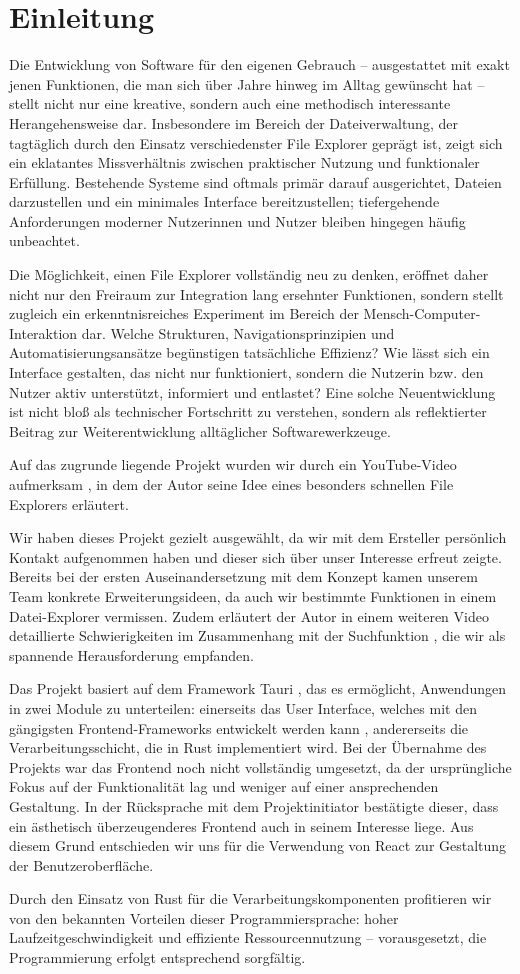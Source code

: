 \section{Einleitung}

Die Entwicklung von Software für den eigenen Gebrauch – ausgestattet mit exakt jenen Funktionen, die man sich über Jahre hinweg im
Alltag gewünscht hat – stellt nicht nur eine kreative, sondern auch eine methodisch interessante Herangehensweise dar.
Insbesondere im Bereich der Dateiverwaltung, der tagtäglich durch den Einsatz verschiedenster File Explorer geprägt ist, zeigt
sich ein eklatantes Missverhältnis zwischen praktischer Nutzung und funktionaler Erfüllung. Bestehende Systeme sind oftmals primär
darauf ausgerichtet, Dateien darzustellen und ein minimales Interface bereitzustellen; tiefergehende Anforderungen moderner
Nutzerinnen und Nutzer bleiben hingegen häufig unbeachtet.

Die Möglichkeit, einen File Explorer vollständig neu zu denken, eröffnet daher nicht nur den Freiraum zur Integration lang
ersehnter Funktionen, sondern stellt zugleich ein erkenntnisreiches Experiment im Bereich der Mensch-Computer-Interaktion dar.
Welche Strukturen, Navigationsprinzipien und Automatisierungsansätze begünstigen tatsächliche Effizienz? Wie lässt sich ein
Interface gestalten, das nicht nur funktioniert, sondern die Nutzerin bzw. den Nutzer aktiv unterstützt, informiert und entlastet?
Eine solche Neuentwicklung ist nicht bloß als technischer Fortschritt zu verstehen, sondern als reflektierter Beitrag zur
Weiterentwicklung alltäglicher Softwarewerkzeuge.

Auf das zugrunde liegende Projekt wurden wir durch ein YouTube-Video aufmerksam \cite{connaticus01}, in dem der Autor seine Idee
eines besonders schnellen File Explorers erläutert.

Wir haben dieses Projekt gezielt ausgewählt, da wir mit dem Ersteller persönlich Kontakt aufgenommen haben und dieser sich über
unser Interesse erfreut zeigte. Bereits bei der ersten Auseinandersetzung mit dem Konzept kamen unserem Team konkrete
Erweiterungsideen, da auch wir bestimmte Funktionen in einem Datei-Explorer vermissen. Zudem erläutert der Autor in einem weiteren
Video detaillierte Schwierigkeiten im Zusammenhang mit der Suchfunktion \cite{connaticus02}, die wir als spannende Herausforderung
empfanden.

Das Projekt basiert auf dem Framework Tauri \cite{tauri2025}, das es ermöglicht, Anwendungen in zwei Module zu unterteilen:
einerseits das User Interface, welches mit den gängigsten Frontend-Frameworks entwickelt werden kann \cite{tauri_frontends},
andererseits die Verarbeitungsschicht, die in Rust \cite{rust} implementiert wird. Bei der Übernahme des Projekts war das Frontend
noch nicht vollständig umgesetzt, da der ursprüngliche Fokus auf der Funktionalität lag und weniger auf einer ansprechenden
Gestaltung. In der Rücksprache mit dem Projektinitiator bestätigte dieser, dass ein ästhetisch überzeugenderes Frontend auch in
seinem Interesse liege. Aus diesem Grund entschieden wir uns für die Verwendung von React zur Gestaltung der Benutzeroberfläche.

Durch den Einsatz von Rust für die Verarbeitungskomponenten profitieren wir von den bekannten Vorteilen dieser Programmiersprache:
hoher Laufzeitgeschwindigkeit und effiziente Ressourcennutzung – vorausgesetzt, die Programmierung erfolgt entsprechend
sorgfältig.
